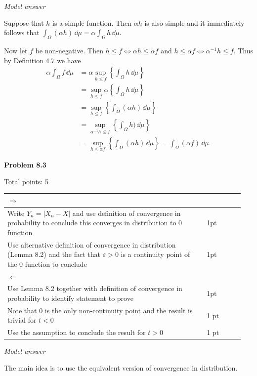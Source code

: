 \documentclass{lecturenotes}
\begin{document}
\begin{enumerate}[label={(\alph*)}]
\textit{Model answer}


Suppose that $h$ is a simple function. Then $\alpha h$ is also simple and it immediately follows that $\int_\Omega (\alpha h) \, \dd \mu = \alpha \int_\Omega h \, \dd \mu$. 

Now let $f$ be non-negative. Then $h \le f \iff \alpha h \le \alpha f$ and $h \le \alpha f \iff \alpha^{-1} h \le f$. Thus by Definition 4.7 we have
\begin{align*}
	\alpha \int_\Omega f \, \dd \mu &= \alpha \sup_{h \le f}\left\{\int_\Omega h \, \dd \mu\right\}\\
	&= \sup_{h \le f} \alpha \left\{\int_\Omega  h \, \dd \mu\right\}\\
	&= \sup_{h \le f} \left\{\int_\Omega (\alpha h) \, \dd \mu\right\}\\
	&= \sup_{\alpha^{-1} h \le f} \left\{\int_\Omega h) \, \dd \mu\right\}\\
	&= \sup_{h \le \alpha f} \left\{\int_\Omega (\alpha h) \, \dd \mu\right\} = \int_\Omega (\alpha f) \, \dd \mu.
\end{align*}
\end{enumerate}

\textbf{Problem 8.3} 

Total points: 5\hfill

\begin{tabular}{p{0.8\linewidth}p{0.15\linewidth}}
\hline
$\Rightarrow$ & \\
\hline
Write $Y_n = |X_n - X|$ and use definition of convergence in probability to conclude this converges in distribution to $0$ function & 1pt\\
Use alternative definition of convergence in distribution (Lemma 8.2) and the fact that $\varepsilon > 0$ is a continuity point of the $0$ function to conclude & 1pt\\
\hline
$\Leftarrow$ & \\
\hline 
Use Lemma 8.2 together with definition of convergence in probability to identify statement to prove & 1pt\\
Note that $0$ is the only non-continuity point and the result is trivial for $t < 0$ & 1 pt\\
Use the assumption to conclude the result for $t > 0$ & 1 pt\\
\hline
\end{tabular}

\textit{Model answer}

The main idea is to use the equivalent version of convergence in distribution.
\end{document}
